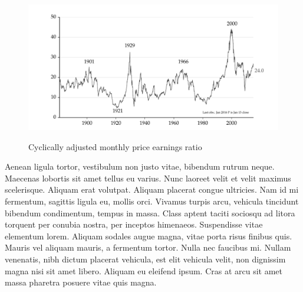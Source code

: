 \documentclass[11pt,a4paper]{article}
\begin{document}
\begin{figure}
\caption{Cyclically adjusted monthly price earnings ratio}
	\centering
	\includegraphics[trim=0cm 0cm 0cm 0cm, clip=true, totalheight=0.3\textheight]{figures/pe_ratio}
	\label{fig:shiller_pe}
\end{figure}


Aenean ligula tortor, vestibulum non justo vitae, bibendum rutrum neque. Maecenas lobortis sit amet tellus eu varius. Nunc laoreet velit et velit maximus scelerisque. Aliquam erat volutpat. Aliquam placerat congue ultricies. Nam id mi fermentum, sagittis ligula eu, mollis orci. Vivamus turpis arcu, vehicula tincidunt bibendum condimentum, tempus in massa. Class aptent taciti sociosqu ad litora torquent per conubia nostra, per inceptos himenaeos. Suspendisse vitae elementum lorem. Aliquam sodales augue magna, vitae porta risus finibus quis. Mauris vel aliquam mauris, a fermentum tortor. Nulla nec faucibus mi. Nullam venenatis, nibh dictum placerat vehicula, est elit vehicula velit, non dignissim magna nisi sit amet libero. Aliquam eu eleifend ipsum. Cras at arcu sit amet massa pharetra posuere vitae quis magna.
\end{document}
